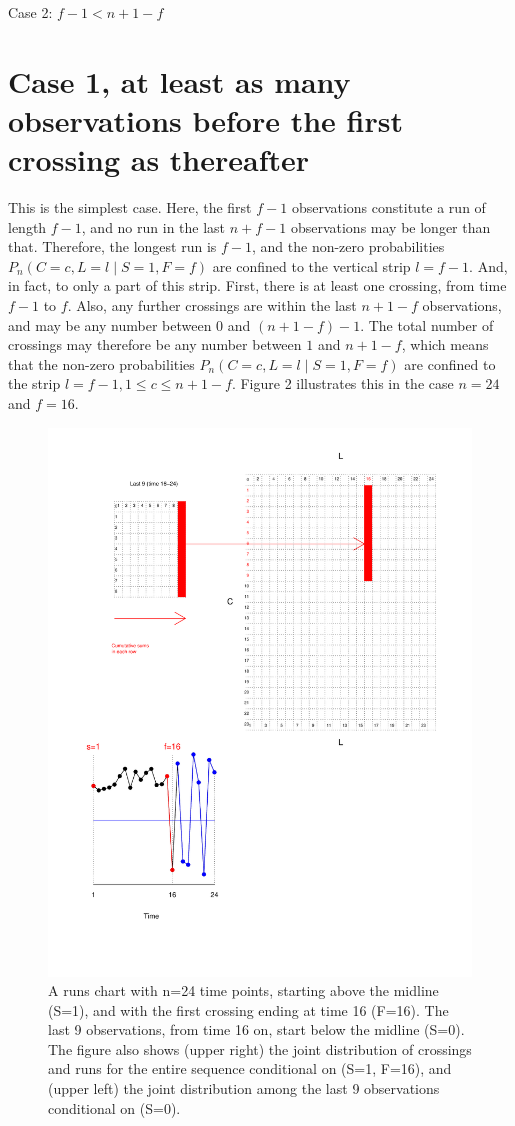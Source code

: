 Case 2: $f-1<n+1-f$

\section{Case 1, at least as many observations before the first crossing as thereafter}

This is the simplest case. Here, the first $f-1$ observations constitute a run of length $f-1$, and no run in the last $n+f-1$ observations may be longer than that. Therefore, the longest run is $f-1$, and the non-zero probabilities $P_n (C=c,L=l \mid S=1,F=f)$ are confined to the vertical strip $l=f-1$. And, in fact, to only a part of this strip. First, there is at least one crossing, from time $f-1$ to $f$. Also, any further crossings are within the last $n+1-f$ observations, and may be any number between $0$ and $(n+1-f) - 1$. The total number of crossings may therefore be any number between $1$ and $n+1-f$, which means that the non-zero probabilities $P_n (C=c,L=l \mid S=1,F=f)$ are confined to the strip $l=f-1, 1 \leq c \leq n+1-f$. Figure 2 illustrates this in the case $n=24$ and $f=16$.

\begin{figure}[htbp]
  \centering
  \caption{A runs chart with n=24 time points, starting above the 
  midline (S=1), and with the first crossing ending at time 16 (F=16). The last 9 observations, from time 16 on, start below the midline (S=0). The figure also shows (upper right) the joint distribution of crossings and runs for the entire sequence conditional on (S=1, F=16), and (upper left) the joint distribution among the last 9 observations conditional on (S=0).}
  \label{figure:rch}
  \includegraphics{run24}
\end{figure}

